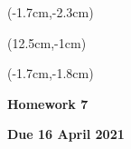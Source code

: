 \documentclass[12pt, oneside]{article}
\begin{document}
\begin{textblock*}{4cm}(-1.7cm,-2.3cm)
\end{textblock*}

\begin{textblock*}{8cm}(12.5cm,-1cm)
\end{textblock*}
\begin{textblock*}{13.5cm}(-1.7cm,-1.8cm)
\end{textblock*}

\vspace{1cm}

\begin{center}
\textbf{\Large Homework 7}

\textbf{Due 16 April 2021}
\end{center}
\end{document}

